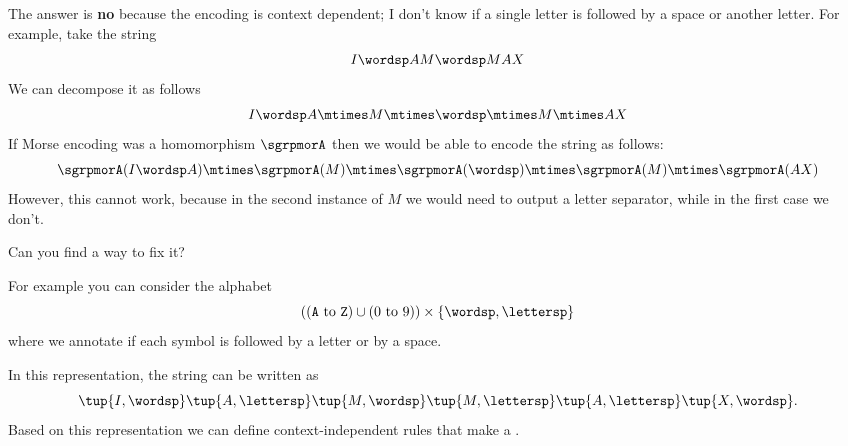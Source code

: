 \begin{solution}
The answer is \textbf{no} because the encoding is context dependent; I don't know if a single letter is followed by a space or another letter.
For example, take the string
    \begin{equation}
    I\wordsp AM\wordsp MAX
    \end{equation}
We can decompose it as follows
\begin{equation}
    I\wordsp A\mtimes M \mtimes \wordsp \mtimes M \mtimes AX
    \end{equation}
If Morse encoding was a homomorphism $\sgrpmorA$ then we would be able to encode the string as follows:
\begin{equation}
    \sgrpmorA(I\wordsp A) \mtimes \sgrpmorA (M) \mtimes  \sgrpmorA(\wordsp) \mtimes  \sgrpmorA(M)
     \mtimes  \sgrpmorA(AX)
    \end{equation}
However, this cannot work, because in the second instance of $M$ we would need to output a letter separator, while in the first case we don't.

Can you find a way to fix it?

For example you can consider the alphabet
\begin{equation}
 \left( (\texttt{A} \ \text{to}\ \texttt{Z}) \cup (0 \ \text{to}\ 9) \right) \times \{\wordsp, \lettersp\}
\end{equation}
where we annotate if each symbol is followed by a letter or by a space.

In this representation, the string can be written as
\begin{equation}
 \tup{I, \wordsp} \tup{A, \lettersp} \tup{ M, \wordsp} \tup{M, \lettersp} \tup{A, \lettersp}
  \tup{X, \wordsp}.
\end{equation}
Based on this representation we can define context-independent rules that make a \whomo.
\end{solution}

\begin{example}
\end{example}


\begin{example}
\end{example}


